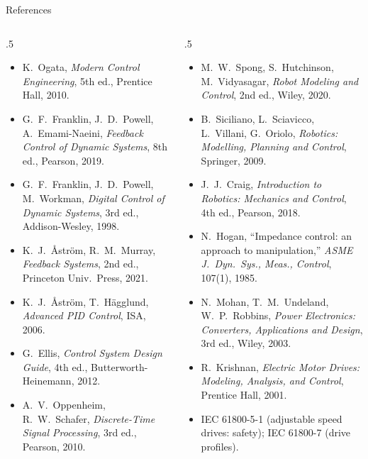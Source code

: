 \documentclass[aspectratio=169,10pt]{beamer}
\begin{document}
\begin{frame}{References}
\fontsize{7}{8.4}\selectfont
\begin{columns}[T]
\begin{column}{.5\textwidth}
\begin{itemize}\setlength\itemsep{.2mm}
\item K.~Ogata, \emph{Modern Control Engineering}, 5th ed., Prentice Hall, 2010.
\item G.~F.~Franklin, J.~D.~Powell, A.~Emami-Naeini, \emph{Feedback Control of Dynamic Systems}, 8th ed., Pearson, 2019.
\item G.~F.~Franklin, J.~D.~Powell, M.~Workman, \emph{Digital Control of Dynamic Systems}, 3rd ed., Addison-Wesley, 1998.
\item K.~J.~{\AA}str\"om, R.~M.~Murray, \emph{Feedback Systems}, 2nd ed., Princeton Univ.\ Press, 2021.
\item K.~J.~{\AA}str\"om, T.~H\"agglund, \emph{Advanced PID Control}, ISA, 2006.
\item G.~Ellis, \emph{Control System Design Guide}, 4th ed., Butterworth-Heinemann, 2012.
\item A.~V.~Oppenheim, R.~W.~Schafer, \emph{Discrete-Time Signal Processing}, 3rd ed., Pearson, 2010.
\end{itemize}
\end{column}
\begin{column}{.5\textwidth}
\begin{itemize}\setlength\itemsep{.2mm}
\item M.~W.~Spong, S.~Hutchinson, M.~Vidyasagar, \emph{Robot Modeling and Control}, 2nd ed., Wiley, 2020.
\item B.~Siciliano, L.~Sciavicco, L.~Villani, G.~Oriolo, \emph{Robotics: Modelling, Planning and Control}, Springer, 2009.
\item J.~J.~Craig, \emph{Introduction to Robotics: Mechanics and Control}, 4th ed., Pearson, 2018.
\item N.~Hogan, ``Impedance control: an approach to manipulation,'' \emph{ASME J.\ Dyn.\ Sys., Meas., Control}, 107(1), 1985.
\item N.~Mohan, T.~M.~Undeland, W.~P.~Robbins, \emph{Power Electronics: Converters, Applications and Design}, 3rd ed., Wiley, 2003.
\item R.~Krishnan, \emph{Electric Motor Drives: Modeling, Analysis, and Control}, Prentice Hall, 2001.
\item IEC 61800-5-1 (adjustable speed drives: safety); IEC 61800-7 (drive profiles).
\end{itemize}
\end{column}
\end{columns}
\end{frame}
\end{document}
